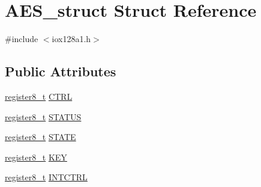 \hypertarget{struct_a_e_s__struct}{
\section{AES\_\-struct Struct Reference}
\label{struct_a_e_s__struct}
}


{\ttfamily \#include $<$iox128a1.h$>$}

\subsection*{Public Attributes}
\begin{DoxyCompactItemize}
\item 
\hyperlink{iox128a1_8h_a6a0649252b392263406882923b04a9db}{register8\_\-t} \hyperlink{struct_a_e_s__struct_a3606c693d6d94220357ea8704772d5b2}{CTRL}
\item 
\hyperlink{iox128a1_8h_a6a0649252b392263406882923b04a9db}{register8\_\-t} \hyperlink{struct_a_e_s__struct_adfcb8ebd854503b6e29f61012b8b30a4}{STATUS}
\item 
\hyperlink{iox128a1_8h_a6a0649252b392263406882923b04a9db}{register8\_\-t} \hyperlink{struct_a_e_s__struct_aa8e6c65f1089a1b1f78ca8ae38f0d006}{STATE}
\item 
\hyperlink{iox128a1_8h_a6a0649252b392263406882923b04a9db}{register8\_\-t} \hyperlink{struct_a_e_s__struct_a46d2e76116d9e16fc3c4f1da1f16872d}{KEY}
\item 
\hyperlink{iox128a1_8h_a6a0649252b392263406882923b04a9db}{register8\_\-t} \hyperlink{struct_a_e_s__struct_a6fbc11bf47bb845be97ddb78f5922cac}{INTCTRL}
\end{DoxyCompactItemize}


